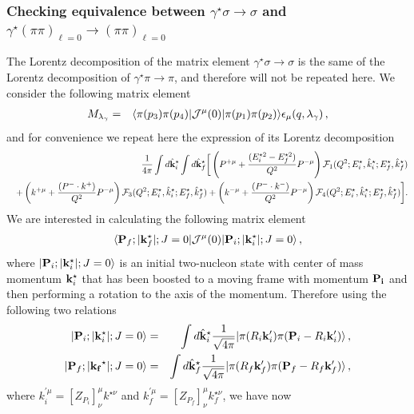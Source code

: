 \subsubsection{Checking equivalence between $\gamma^\star\sigma\to\sigma$ and $\gamma^\star(\pi\pi)_{\ell=0}\to(\pi\pi)_{\ell=0}$}
{\ab 
	The Lorentz decomposition of the matrix element $\gamma^\star\sigma\to\sigma$ is the same of the Lorentz decomposition of $\gamma^\star\pi\to\pi$, and therefore will not be repeated here.
	We consider the following matrix element 
\begin{eqnarray}
M_{\lambda_\gamma}&=&\langle \pi(p_3)\pi(p_4)|{\cal J}^\mu(0)|\pi(p_1)\pi(p_2)\rangle\epsilon_\mu(q,\lambda_\gamma)\, ,
\end{eqnarray}
and for convenience we repeat here the expression of its Lorentz decomposition
\begin{eqnarray}
&&\frac{1}{4\pi}\int d\hat{\bf k}^\star_i\int d\hat{\bf k}^\star_f\bigg[ \left(P^{+\mu}+\frac{(E_i^{\star 2}-E_f^{\star 2})}{Q^2} P^{-\mu}\right)\mathcal{F}_{1}(Q^2;E_i^\star,\hat{k}^\star_i;E_f^\star,\hat{k}^\star_f)
\nonumber\\
&&+
\left(k^{+\mu}+\frac{(P^-\cdot k^{+})}{Q^2} P^{-\mu}\right)
\mathcal{F}_{3}(Q^2;E_i^\star,\hat{k}^\star_i;E_f^\star,\hat{k}^\star_f)
+
\left(k^{-\mu}+\frac{(P^-\cdot k^{-})}{Q^2} P^{-\mu}\right)
\mathcal{F}_{4}(Q^2;E_i^\star,\hat{k}^\star_i;E_f^\star,\hat{k}^\star_f)\bigg].
\label{eq:pipi_to_pipi2}
\end{eqnarray}
We are interested in calculating the following matrix element
\begin{eqnarray}
\langle{\bf P}_f;|{\bf k}^\star_f|;J=0|{\cal J}^\mu(0)|{\bf P}_i;|{\bf k}^\star_i|;J=0\rangle\, ,
\end{eqnarray}
where $|{\bf P}_i;|{\bf k}^\star_i|;J=0\rangle $ is an initial two-nucleon state with center of mass momentum ${\bf k}^\star_i$ that has been boosted to a moving frame with momentum ${\bf P_i}$ and then performing a rotation to the axis of the momentum. Therefore using the following two relations
\begin{eqnarray}
|{\bf P}_i;|{\bf k}_i^\star|;J=0\rangle&=&\int d\hat{\bf k}^\star_i\frac{1}{\sqrt{4\pi}}|\pi(R_i{\bf k}_i^\prime)\pi({\bf P}_i-R_i{\bf k}_i^\prime)\rangle\, ,\\
|{\bf P}_f;|{\bf k_f}^\star|;J=0\rangle&=&\int d\hat{\bf k}^\star_f\frac{1}{\sqrt{4\pi}}|\pi(R_f{\bf k}_f^\prime)\pi({\bf P}_f-R_f{\bf k}_f^\prime)\rangle\, ,
\end{eqnarray}
where $k_i^{\prime\mu}=\left[Z_{P_i}\right]^\mu_\nu k^{\star\nu}$ and $k_f^{\prime\mu}=\left[Z_{P_f}\right]^\mu_\nu k_f^{\star\nu}$, we have now
}
